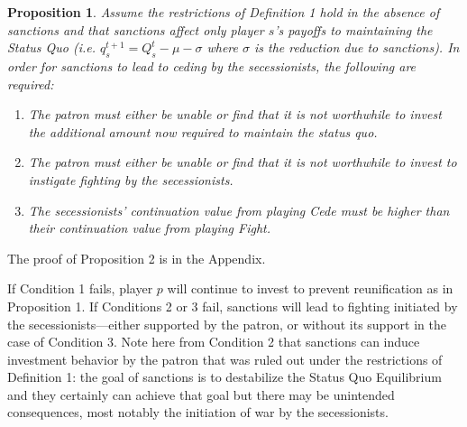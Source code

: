 \documentclass[11pt,letterpaper, notitlepage]{article}
\newtheorem{proposition}{Proposition}
\begin{document}

\begin{proposition}
Assume the restrictions of \emph{Definition 1} hold in the absence of sanctions and that sanctions affect only player $s$'s payoffs to maintaining the Status Quo (i.e. $q_s^{t+1} = Q_s^t - \mu -\sigma$ where $\sigma$ is the reduction due to sanctions).  In order for sanctions to lead to ceding by the secessionists, the following are required:

\begin{enumerate}
\item \textit{The patron must either be unable or find that it is not worthwhile to invest the additional amount now required to maintain the status quo.}

\item \textit{The patron must either be unable or find that it is not worthwhile to invest to instigate fighting by the secessionists.}



\item \textit{The secessionists' continuation value from playing Cede must be higher than their continuation value from playing Fight.}
\end{enumerate}

\end{proposition}

The proof of Proposition 2 is in the Appendix.

If Condition 1 fails, player $p$ will continue to invest to prevent reunification as in Proposition 1. If Conditions 2 or 3 fail, sanctions will lead to fighting initiated by the secessionists---either supported by the patron, or without its support in the case of Condition 3. Note here from Condition 2 that sanctions can induce investment behavior by the patron that was ruled out under the restrictions of Definition 1: the goal of sanctions is to destabilize the Status Quo Equilibrium and they certainly can achieve that goal but there may be unintended consequences, most notably the initiation of war by the secessionists. 
\end{document}
